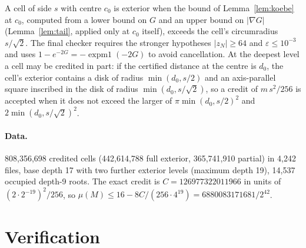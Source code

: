 \documentclass[11pt]{article}
\begin{document}
A cell of side $s$ with centre $c_0$ is exterior when the bound of Lemma~\ref{lem:koebe} at $c_0$, computed from a lower bound on $G$ and an upper bound on $|\nabla G|$ (Lemma~\ref{lem:tail}, applied only at $c_0$ itself), exceeds the cell's circumradius $s/\sqrt2$. The final checker requires the stronger hypotheses $|z_N|\ge64$ and $\varepsilon\le10^{-3}$ and uses $1-e^{-2G}=-\operatorname{expm1}(-2G)$ to avoid cancellation. At the deepest level a cell may be credited in part: if the certified distance at the centre is $d_0$, the cell's exterior contains a disk of radius $\min(d_0,s/2)$ and an axis-parallel square inscribed in the disk of radius $\min(d_0,s/\sqrt2)$, so a credit of $m\,s^2/256$ is accepted when it does not exceed the larger of $\pi\min(d_0,s/2)^2$ and $2\min(d_0,s/\sqrt2)^2$.

\paragraph{Data.} 808,356,698 credited cells (442,614,788 full exterior, 365,741,910 partial) in 4,242 files, base depth 17 with two further exterior levels (maximum depth 19), 14,537 occupied depth-9 roots. The exact credit is $C=126977322011966$ in units of $(2\cdot2^{-19})^2/256$, so $\mu(M)\le16-8C/(256\cdot4^{19})=6880083171681/2^{42}$.

\section{Verification}
\end{document}
